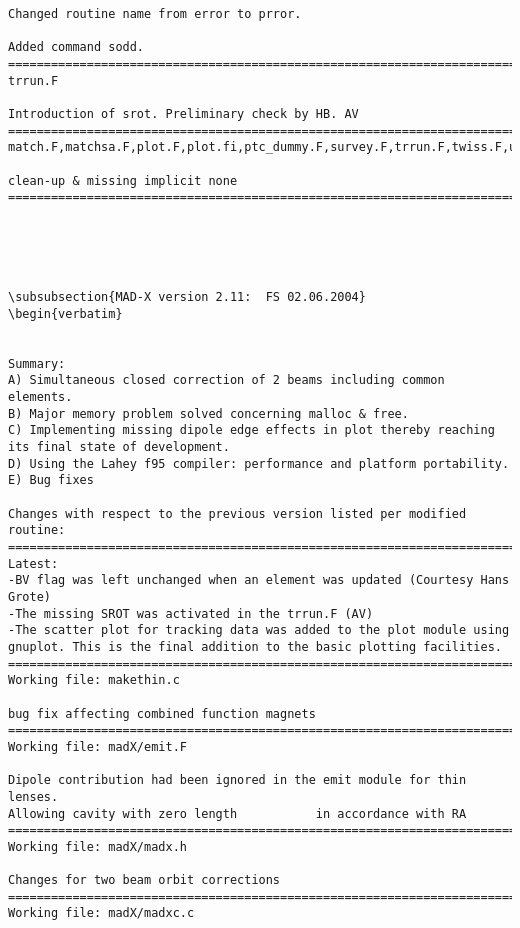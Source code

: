 \begin{verbatim}
Changed routine name from error to prror.

Added command sodd.
=============================================================================
trrun.F

Introduction of srot. Preliminary check by HB. AV
=============================================================================
match.F,matchsa.F,plot.F,plot.fi,ptc_dummy.F,survey.F,trrun.F,twiss.F,util.F, 

clean-up & missing implicit none
=============================================================================





\subsubsection{MAD-X version 2.11:  FS 02.06.2004}
\begin{verbatim}


Summary:
A) Simultaneous closed correction of 2 beams including common elements.
B) Major memory problem solved concerning malloc & free.
C) Implementing missing dipole edge effects in plot thereby reaching
its final state of development.
D) Using the Lahey f95 compiler: performance and platform portability.
E) Bug fixes

Changes with respect to the previous version listed per modified routine:
=============================================================================
Latest:
-BV flag was left unchanged when an element was updated (Courtesy Hans
Grote)
-The missing SROT was activated in the trrun.F (AV)
-The scatter plot for tracking data was added to the plot module using
gnuplot. This is the final addition to the basic plotting facilities.
=============================================================================
Working file: makethin.c

bug fix affecting combined function magnets
=============================================================================
Working file: madX/emit.F

Dipole contribution had been ignored in the emit module for thin lenses.
Allowing cavity with zero length           in accordance with RA
=============================================================================
Working file: madX/madx.h

Changes for two beam orbit corrections
=============================================================================
Working file: madX/madxc.c


\end{verbatim}

